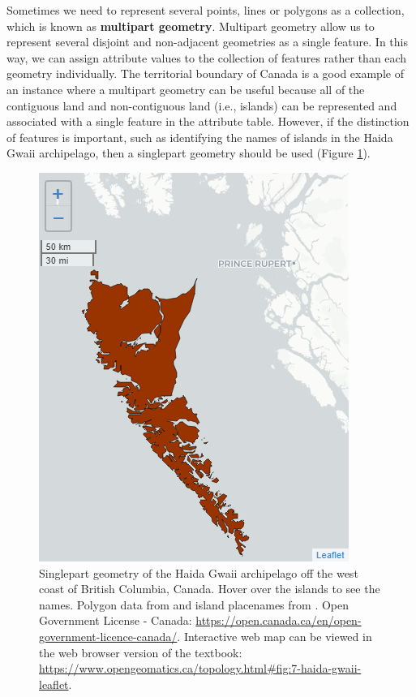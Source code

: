 \documentclass[
]{book}
\begin{document}
Sometimes we need to represent several points, lines or polygons as a collection, which is known as \textbf{multipart geometry}. Multipart geometry allow us to represent several disjoint and non-adjacent geometries as a single feature. In this way, we can assign attribute values to the collection of features rather than each geometry individually. The territorial boundary of Canada is a good example of an instance where a multipart geometry can be useful because all of the contiguous land and non-contiguous land (i.e., islands) can be represented and associated with a single feature in the attribute table. However, if the distinction of features is important, such as identifying the names of islands in the Haida Gwaii archipelago, then a singlepart geometry should be used (Figure \ref{fig:7-haida-gwaii-leaflet}).



\begin{figure}
\includegraphics[width=0.5\linewidth]{images/07-Singlepart-geometry-of-the-Haida-Gwaii-archipelago-off-the-west-coast-of-British-Columbia-Canada-static} \caption{Singlepart geometry of the Haida Gwaii archipelago off the west coast of British Columbia, Canada. Hover over the islands to see the names. Polygon data from \citep{statistics_canada_statistics_nodate} and island placenames from \citep{natural_resources_canada_natural_nodate}. Open Government License - Canada: \url{https://open.canada.ca/en/open-government-licence-canada/}. Interactive web map can be viewed in the web browser version of the textbook: \url{https://www.opengeomatics.ca/topology.html\#fig:7-haida-gwaii-leaflet}.}\label{fig:7-haida-gwaii-leaflet}
\end{figure}
\end{document}
